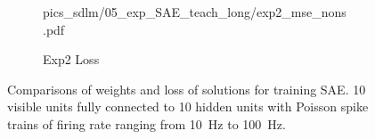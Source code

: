 \begin{figure}
\begin{subfigure}[c]{0.45\textwidth}
{			{pics_sdlm/05_exp_SAE_teach_long/exp2_mse_nons.pdf}}\\
		\caption{Exp2 Loss}
	\end{subfigure}%
	\caption{Comparisons of weights and loss of solutions for training SAE. 10 visible units fully connected to 10 hidden units with Poisson spike trains of firing rate ranging from 10~Hz to 100~Hz.}
	\label{fig:sols_ae}
\end{figure}

